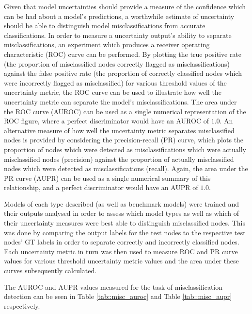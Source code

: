 \documentclass[journal]{IEEEtran}
\begin{document}
Given that model uncertainties should provide a measure of the confidence which can be had about a model's predictions, a worthwhile estimate of uncertainty should be able to distinguish model misclassifications from accurate classifications. In order to measure a uncertainty output's ability to separate misclassifications, an experiment which produces a receiver operating characteristic (ROC) curve can be performed. By plotting the true positive rate (the proportion of misclassified nodes correctly flagged as misclassifications) against the false positive rate (the proportion of correctly classified nodes which were incorrectly flagged as misclassified) for various threshold values of the uncertainty metric, the ROC curve can be used to illustrate how well the uncertainty metric can separate the model's misclassifications. The area under the ROC curve (AUROC) can be used as a single numerical representation of the ROC figure, where a perfect discriminator would have an AUROC of $1.0$. An alternative measure of how well the uncertainty metric separates misclassified nodes is provided by considering the precision-recall (PR) curve, which plots the proportion of nodes which were detected as misclassifications which were actually misclassified nodes (precision) against the proportion of actually misclassified nodes which were detected as misclassifications (recall). Again, the area under the PR curve (AUPR) can be used as a single numerical summary of this relationship, and a perfect discriminator would have an AUPR of $1.0$.

Models of each type described (as well as benchmark models) were trained and their outputs analysed in order to assess which model types as well as which of their uncertainty measures were best able to distinguish misclassified nodes. This was done by comparing the output labels for the test nodes to the respective test nodes' GT labels in order to separate correctly and incorrectly classified nodes. Each uncertainty metric in turn was then used to measure ROC and PR curve values for various threshold uncertainty metric values and the area under these curves subsequently calculated.

The AUROC and AUPR values measured for the task of misclassification detection can be seen in Table \ref{tab::misc_auroc} and Table \ref{tab::misc_aupr} respectively.
\end{document}
